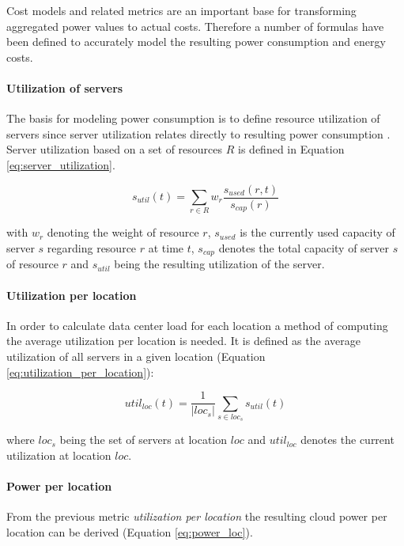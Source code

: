 Cost models and related metrics are an important base for transforming aggregated power values to actual costs. Therefore a number of formulas have been defined to accurately model the resulting power consumption and energy costs. 

\paragraph{Utilization of servers}
The basis for modeling power consumption is to define resource utilization of servers since server utilization relates directly to resulting power consumption \cite{meisner2009powernap}. 
Server utilization based on a set of resources $R$ is defined in Equation \ref{eq:server_utilization}. 

\begin{equation}
	s_{util}(t) = \sum_{r \in R} w_r \frac{s_{used}(r,t)}{s_{cap}(r)}
	\label{eq:server_utilization}
\end{equation}

with $w_r$ denoting the weight of resource $r$, $s_{used}$ is the currently used capacity of server $s$ regarding resource $r$ at time $t$, $s_{cap}$ denotes the total capacity of server $s$ of resource $r$ and $s_{util}$ being the resulting utilization of the server. 


\paragraph{Utilization per location}
In order to calculate data center load for each location a method of computing the average utilization per location is needed. 
It is defined as the average utilization of all servers in a given location (Equation \ref{eq:utilization_per_location}): 

\begin{equation}
	util_{loc}(t) = \frac{1}{|loc_{s}|} \sum_{s \in loc_{s}} s_{util}(t)
\label{eq:utilization_per_location}
\end{equation}

where $loc_{s}$ being the set of servers at location $loc$ and $util_{loc}$ denotes the current utilization at location $loc$. 


\paragraph{Power per location}

From the previous metric \textit{utilization per location} the resulting cloud power per location can be derived (Equation \ref{eq:power_loc}). 

